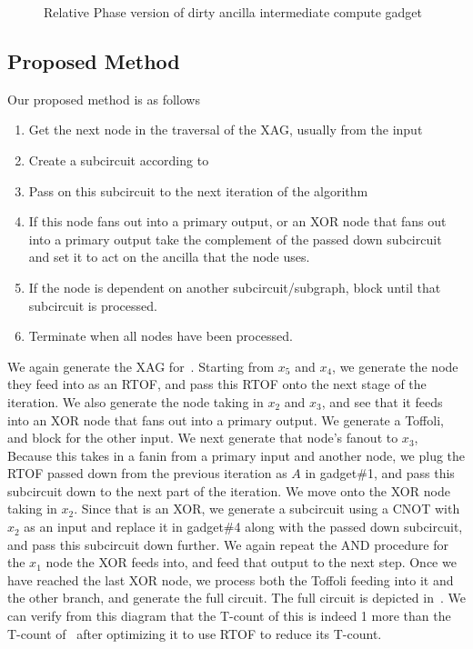 \begin{figure}
  \scalebox{0.6} {
    
  }
  \caption{Relative Phase version of dirty ancilla intermediate compute gadget}
  \label{fig-dirty-gadget-rp}
\end{figure}

\subsection{Proposed Method}

Our proposed method is as follows

\begin{enumerate}
\item Get the next node in the traversal of the XAG, usually from the input
\item Create a subcircuit according to~
\item Pass on this subcircuit to the next iteration of the algorithm
\item If this node fans out into a primary output, or an XOR node that fans out
  into a primary output take the complement of the passed down subcircuit and set
  it to act on the ancilla that the node uses.
\item If the node is dependent on another subcircuit/subgraph, block until that subcircuit is
  processed.
\item Terminate when all nodes have been processed.
\end{enumerate}

\begin{example}
  \label{ex-dirty-xag}
  We again generate the XAG for~. Starting from $x_5$ and $x_4$, we
  generate the node they feed into as an RTOF, and pass this RTOF onto the next stage of the iteration.
  We also generate the node taking in $x_2$ and $x_3$, and see that it feeds into an XOR node that
  fans out into a primary output. We generate a Toffoli, and block for the other input.
  We next generate that node's fanout to $x_3$, Because this takes in a fanin from a primary
  input and another node, we plug the RTOF passed down from the previous iteration as $A$
  in gadget\#1, and pass this subcircuit down to the next part of the iteration. We move onto
  the XOR node taking in $x_2$. Since that is an XOR, we generate a subcircuit using a CNOT with
  $x_2$ as an input and replace it in gadget\#4 along with the passed down subcircuit, and pass this
  subcircuit down further. We again repeat the AND procedure for the $x_1$ node the XOR feeds into,
  and feed that output to the next step. Once we have reached the last XOR node, we process both
  the Toffoli feeding into it and the other branch, and generate the full circuit. The full circuit
  is depicted in~. We can verify from this diagram that the T-count of this
  is indeed 1 more than the T-count of~ after optimizing it to use RTOF to reduce
  its T-count.
\end{example}

